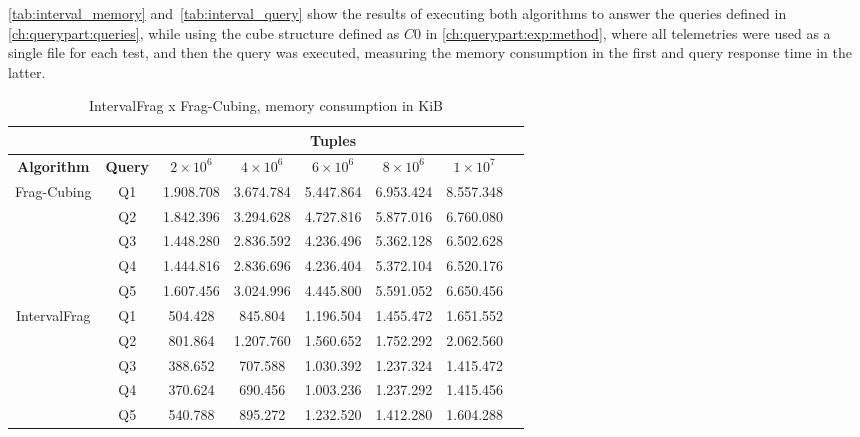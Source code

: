 \autoref{tab:interval_memory} and~\autoref{tab:interval_query} show the results of executing both algorithms to answer the queries defined in \autoref{ch:querypart:queries}, while using the cube structure defined as $C0$ in \autoref{ch:querypart:exp:method}, where all telemetries were used as a single file for each test, and then the query was executed, measuring the memory consumption in the first and query response time in the latter.

\begin{table}[!ht]
  \centering
  \caption{IntervalFrag x Frag-Cubing, memory consumption in KiB}\label{tab:interval_memory}
  \begin{tabular}{|c|c|c|c|c|c|c|c|}
    \hline
    & & \multicolumn{5}{c|}{\textbf{Tuples}} \\
    \hline
    \bfseries Algorithm & \bfseries Query & \bfseries $2\times10^6$ & \bfseries $4\times10^6$ & \bfseries $6\times10^6$ & \bfseries $8\times10^6$ & \bfseries $1\times10^7$\\
    \hline
    \multirow{5}{*}{Frag-Cubing} & Q1 &
    1.908.708 & 3.674.784 & 5.447.864 & 6.953.424 & 8.557.348
    \\\cline{2-7} & Q2 &
    1.842.396 & 3.294.628 & 4.727.816 & 5.877.016 & 6.760.080
    \\\cline{2-7} & Q3 &
    1.448.280 & 2.836.592 & 4.236.496 & 5.362.128 & 6.502.628
    \\\cline{2-7} & Q4 &
    1.444.816 & 2.836.696 & 4.236.404 & 5.372.104 & 6.520.176
    \\\cline{2-7} & Q5 &
    1.607.456 & 3.024.996 & 4.445.800 & 5.591.052 & 6.650.456
    \\\hline
    \multirow{5}{*}{IntervalFrag} & Q1 &
    504.428 & 845.804 & 1.196.504 & 1.455.472 & 1.651.552
    \\\cline{2-7}
    & Q2 &
    801.864 & 1.207.760 & 1.560.652 & 1.752.292 & 2.062.560
    \\\cline{2-7} & Q3 &
    388.652 & 707.588 & 1.030.392 & 1.237.324 & 1.415.472
    \\\cline{2-7}
    & Q4 &
    370.624 & 690.456 & 1.003.236 & 1.237.292 & 1.415.456
    \\\cline{2-7}
    & Q5 &
    540.788 & 895.272 & 1.232.520 & 1.412.280 & 1.604.288
    \\\hline
  \end{tabular}
\end{table}

